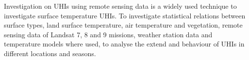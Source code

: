 Investigation on \glspl{UHI} using remote sensing data is a widely used technique to investigate surface temperature \glspl{UHI}. 
To investigate statistical relations between surface types, land surface temperature, air temperature and vegetation, remote sensing data of Landsat 7, 8 and 9 missions, weather station data and temperature models where used, to analyse the extend and behaviour of \glspl{UHI} in different locations and seasons. 

